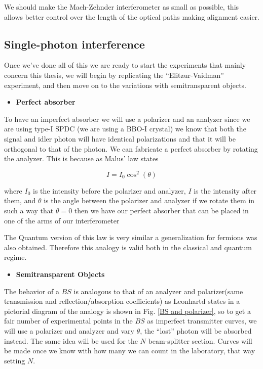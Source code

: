 \documentclass{book}
\begin{document}
We should make the Mach-Zehnder interferometer as small as possible, this allows better control over the length of the optical paths making alignment easier.

\subsection{Single-photon interference}

Once we've done all of this we are ready to start the experiments that mainly concern this thesis, we will begin by replicating the ``Elitzur-Vaidman'' experiment, and then move on to the variations with semitransparent objects.


\begin{itemize}
\item {\large \textbf{Perfect absorber}}
\end{itemize}
To have an imperfect absorber we will use a polarizer and an analyzer since we are using type-I SPDC (we are using a BBO-I crystal) we know that both the signal and idler photon will have identical polarizations and that it will be orthogonal to that of the photon. We can fabricate a perfect absorber by rotating the analyzer. This is because as Malus' law states \cite{hecht}

\begin{equation}
I=I_{0} \cos^{2}(\theta)
\end{equation}

where $I_{0}$ is the intensity before the polarizer and analyzer, $I$ is the intensity after them, and $\theta$ is the angle between the polarizer and analyzer if we rotate them in such a way that $\theta=0$ then we have our perfect absorber that can be placed in one of the arms of our interferometer


The Quantum version of this law is very similar \cite{malus} a generalization for fermions was also obtained. Therefore this analogy is valid both in the classical and quantum regime.
 \begin{itemize}
\item {\large \textbf{Semitransparent Objects}}
\end{itemize}

The behavior of a $BS$ is analogous to that of an analyzer and polarizer(same transmission and reflection/absorption coefficients) as Leonhartd states in \cite{Leonhardt_2003} a pictorial diagram of the analogy is shown in Fig. \ref{BS and polarizer}, so to get a fair number of experimental points in the $BS$ as imperfect transmitter curves, we will use a polarizer and analyzer and vary $\theta$, the ``lost'' photon will be absorbed instead. The same idea will be used for the $N$ beam-splitter section. Curves will be made once we know with how many we can count in the laboratory, that way setting $N$.
\end{document}
